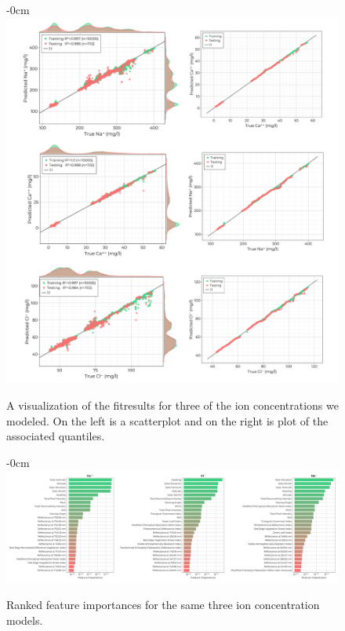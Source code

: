 \documentclass[journal,article,submit,pdftex,moreauthors]{Definitions/mdpi}
\begin{document}
\begin{figure}[H]
\begin{adjustwidth}{-\extralength}{0cm}
\centering
\includegraphics[width=16.0cm]{paper/figures/results/fits/ions-fitres.pdf}
\end{adjustwidth}
\caption{A visualization of the fitresults for three of the ion concentrations we modeled. On the left is a scatterplot and on the right is plot of the associated quantiles.\label{fig:ions-fit}}
\end{figure}  

\begin{figure}[H]
\begin{adjustwidth}{-\extralength}{0cm}
\centering
\includegraphics[width=18.0cm]{paper/figures/results/fits/ions-ranking.pdf}
\end{adjustwidth}
\caption{Ranked feature importances for the same three ion concentration models.\label{fig:ions-fit}}
\end{figure}  
\end{document}
